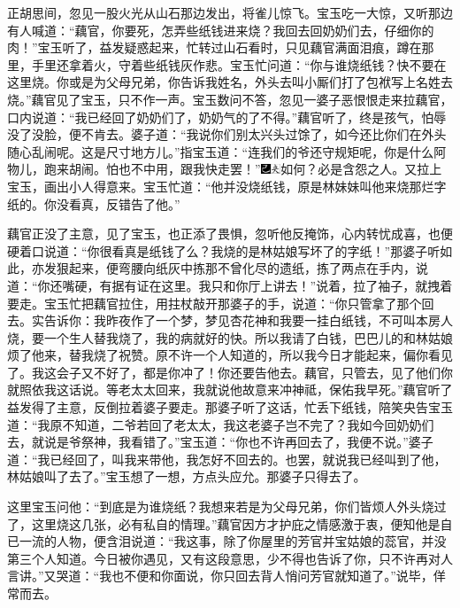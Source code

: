 正胡思间，忽见一股火光从山石那边发出，将雀儿惊飞。宝玉吃一大惊，又听那边有人喊道：``藕官，你要死，怎弄些纸钱进来烧？我回去回奶奶们去，仔细你的肉！''宝玉听了，益发疑惑起来，忙转过山石看时，只见藕官满面泪痕，蹲在那里，手里还拿着火，守着些纸钱灰作悲。宝玉忙问道：``你与谁烧纸钱？快不要在这里烧。你或是为父母兄弟，你告诉我姓名，外头去叫小厮们打了包袱写上名姓去烧。''藕官见了宝玉，只不作一声。宝玉数问不答，忽见一婆子恶恨恨走来拉藕官，口内说道：``我已经回了奶奶们了，奶奶气的了不得。''藕官听了，终是孩气，怕辱没了没脸，便不肯去。婆子道：``我说你们别太兴头过馀了，如今还比你们在外头随心乱闹呢。这是尺寸地方儿。''指宝玉道：``连我们的爷还守规矩呢，你是什么阿物儿，跑来胡闹。怕也不中用，跟我快走罢！''{\includegraphics[width=3mm]{../Images/00003}\includegraphics[width=3mm]{../Images/00012}\footnotesize \kaishu 如何？必是含怨之人。又拉上宝玉，画出小人得意来。}宝玉忙道：``他并没烧纸钱，原是林妹妹叫他来烧那烂字纸的。你没看真，反错告了他。''

藕官正没了主意，见了宝玉，也正添了畏惧，忽听他反掩饰，心内转忧成喜，也便硬着口说道：``你很看真是纸钱了么？我烧的是林姑娘写坏了的字纸！''那婆子听如此，亦发狠起来，便弯腰向纸灰中拣那不曾化尽的遗纸，拣了两点在手内，说道：``你还嘴硬，有据有证在这里。我只和你厅上讲去！''说着，拉了袖子，就拽着要走。宝玉忙把藕官拉住，用拄杖敲开那婆子的手，说道：``你只管拿了那个回去。实告诉你：我昨夜作了一个梦，梦见杏花神和我要一挂白纸钱，不可叫本房人烧，要一个生人替我烧了，我的病就好的快。所以我请了白钱，巴巴儿的和林姑娘烦了他来，替我烧了祝赞。原不许一个人知道的，所以我今日才能起来，偏你看见了。我这会子又不好了，都是你冲了！你还要告他去。藕官，只管去，见了他们你就照依我这话说。等老太太回来，我就说他故意来冲神祗，保佑我早死。''藕官听了益发得了主意，反倒拉着婆子要走。那婆子听了这话，忙丢下纸钱，陪笑央告宝玉道：``我原不知道，二爷若回了老太太，我这老婆子岂不完了？我如今回奶奶们去，就说是爷祭神，我看错了。''宝玉道：``你也不许再回去了，我便不说。''婆子道：``我已经回了，叫我来带他，我怎好不回去的。也罢，就说我已经叫到了他，林姑娘叫了去了。''宝玉想了一想，方点头应允。那婆子只得去了。

这里宝玉问他：``到底是为谁烧纸？我想来若是为父母兄弟，你们皆烦人外头烧过了，这里烧这几张，必有私自的情理。''藕官因方才护庇之情感激于衷，便知他是自已一流的人物，便含泪说道：``我这事，除了你屋里的芳官并宝姑娘的蕊官，并没第三个人知道。今日被你遇见，又有这段意思，少不得也告诉了你，只不许再对人言讲。''又哭道：``我也不便和你面说，你只回去背人悄问芳官就知道了。''说毕，佯常而去。


